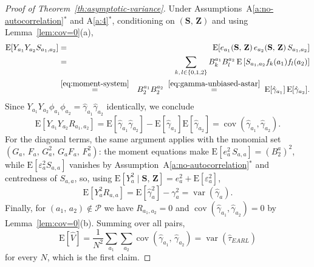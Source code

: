 \documentclass[sigconf,nonacm]{acmart}
\newcommand{\E}{\mathrm E}
\DeclareMathOperator{\var}{var}
\DeclareMathOperator{\cov}{cov}
\begin{document}
\begin{proof}[Proof of Theorem~\ref{th:asymptotic-variance}]
    Under Assumptions~A\ref{a:no-autocorrelation}$^*$ and A\ref{a:4}$^*$, conditioning on $(\mathbf S,\,\mathbf Z)$ and using Lemma~\ref{lem:cov=0}(a),
    \begin{eqnarray*}
        \E[Y_{a_1}Y_{a_2}S_{a_1,a_2}] &=& \E[e_{a_1}(\mathbf S,\,\mathbf Z)\,e_{a_2}(\mathbf S,\,\mathbf Z)\,S_{a_1,a_2}]\\
        &=& \sum_{k,\,l\in\{0,1,2\}}B^{a_1}_kB^{a_2}_l\,\E\left[S_{a_1,a_2}f_k(a_1)f_l(a_2)\right]\\
        &\stackrel{\eqref{eq:moment-system}}{=}& B_2^{a_1}B_2^{a_2} \;\stackrel{\eqref{eq:gamma-unbiased-astar}}{=}\; \E[\hat\gamma_{a_1}]\,\E[\hat\gamma_{a_2}].
    \end{eqnarray*}
    Since $Y_{a_1}Y_{a_2}\phi_{a_1}\phi_{a_2} = \hat\gamma_{a_1}\hat\gamma_{a_2}$ identically, we conclude
    \begin{equation}\label{eq:pair-unbiased}
        \E[Y_{a_1}Y_{a_2}R_{a_1,a_2}] = \E[\hat\gamma_{a_1}\hat\gamma_{a_2}] - \E[\hat\gamma_{a_1}]\E[\hat\gamma_{a_2}] = \cov(\hat\gamma_{a_1},\hat\gamma_{a_2}).
    \end{equation}
    For the diagonal terms, the same argument applies with the monomial set $(G_a,\,F_a,\,G_a^2,\,G_aF_a,\,F_a^2)$: the moment equations make $\E[e_a^2\,S_{a,a}] = (B_2^a)^2$, while $\E[\varepsilon_a^2 S_{a,a}]$ vanishes by Assumption~A\ref{a:no-autocorrelation}$^*$ and centredness of $S_{a,a}$, so, using $\E[Y_a^2\mid\mathbf S,\,\mathbf Z] = e_a^2 + \E[\varepsilon_a^2]$,
    \begin{equation*}
        \E[Y_a^2R_{a,a}] = \E[\hat\gamma_a^2] - \gamma_a^2 = \var(\hat\gamma_a).
    \end{equation*}
    Finally, for $(a_1,\,a_2)\notin\mathcal P$ we have $R_{a_1,a_2}=0$ and $\cov(\hat\gamma_{a_1},\hat\gamma_{a_2})=0$ by Lemma~\ref{lem:cov=0}(b). Summing over all pairs,
    \begin{equation*}
        \E[\hat V] = \frac 1{N^2}\sum_{a_1}\sum_{a_2}\cov(\hat\gamma_{a_1},\,\hat\gamma_{a_2}) = \var(\hat\tau^{\phantom{1}}_{EARL})
    \end{equation*}
    for every $N$, which is the first claim.


\end{proof}
\end{document}
